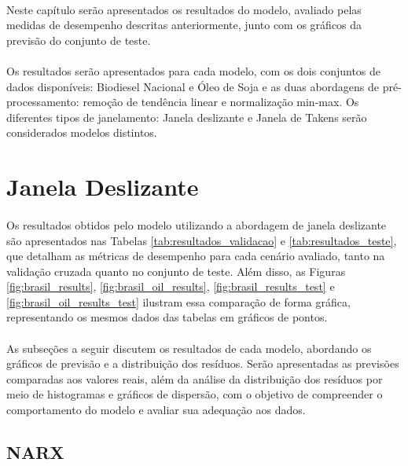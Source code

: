 \paragraph{} Neste capítulo serão apresentados os resultados do modelo, avaliado pelas medidas de desempenho descritas anteriormente, junto com os gráficos da previsão do conjunto de teste.

\paragraph{} Os resultados serão apresentados para cada modelo, com os dois conjuntos de dados disponíveis: Biodiesel Nacional e Óleo de Soja e as duas abordagens de pré-processamento: remoção de tendência linear e normalização min-max. Os diferentes tipos de janelamento: Janela deslizante e Janela de Takens serão considerados modelos distintos.

\section{Janela Deslizante}

\paragraph{} Os resultados obtidos pelo modelo utilizando a abordagem de janela deslizante são apresentados nas Tabelas \ref{tab:resultados_validacao} e \ref{tab:resultados_teste}, que detalham as métricas de desempenho para cada cenário avaliado, tanto na validação cruzada quanto no conjunto de teste. Além disso, as Figuras \ref{fig:brasil_results}, \ref{fig:brasil_oil_results}, \ref{fig:brasil_results_test} e \ref{fig:brasil_oil_results_test} ilustram essa comparação de forma gráfica, representando os mesmos dados das tabelas em gráficos de pontos.
\paragraph{} As subseções a seguir discutem os resultados de cada modelo, abordando os gráficos de previsão e a distribuição dos resíduos. Serão apresentadas as previsões comparadas aos valores reais, além da análise da distribuição dos resíduos por meio de histogramas e gráficos de dispersão, com o objetivo de compreender o comportamento do modelo e avaliar sua adequação aos dados.

\subsection{\acs{NARX}}
